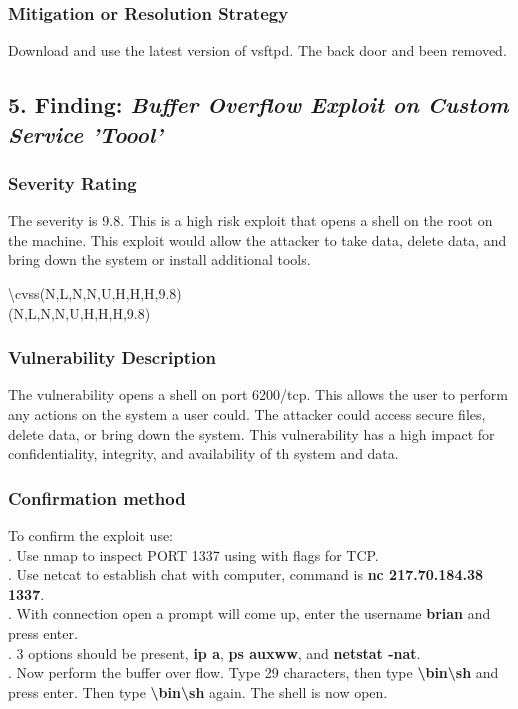 \documentclass[notitlepage]{article}
\begin{document}
	\subsubsection{Mitigation or Resolution Strategy}
	Download and use the latest version of vsftpd. The back door and been removed. \\
	
		
	\subsection{5. Finding: \emph{Buffer Overflow Exploit on Custom Service 'Toool'}}
	
	\subsubsection{Severity Rating}
	\indent The severity is 9.8. This is a high risk exploit that opens a shell on the root on the machine.  This exploit would allow the attacker to take data, delete data, and bring down the system or install additional tools.  
	
	\textbackslash cvss(N,L,N,N,U,H,H,H,9.8)\\
	\cvss(N,L,N,N,U,H,H,H,9.8) \\
	
	\subsubsection{Vulnerability Description}
	\indent The vulnerability opens a shell on port 6200/tcp. This allows the user to perform any actions on the system a user could. The attacker could access secure files, delete data, or bring down the system. This vulnerability has a high impact for confidentiality, integrity, and availability of th system and data. 
	
	\subsubsection{Confirmation method}
	To confirm the exploit use: \\
	. Use nmap to inspect PORT 1337 using with flags for TCP.\\
	. Use netcat to establish chat with computer, command is \textbf{nc 217.70.184.38 1337}.  \\
	. With connection open a prompt will come up, enter the username \textbf{brian} and press enter.\\
	. 3 options should be present, \textbf{ip a}, \textbf{ps auxww}, and \textbf{netstat -nat}. \\
	. Now perform the buffer over flow.  Type 29 characters, then type \textbf{\textbackslash bin\textbackslash sh} and press enter. Then type \textbf{\textbackslash bin\textbackslash sh} again. The shell is now open.  \\
	
\end{document}
